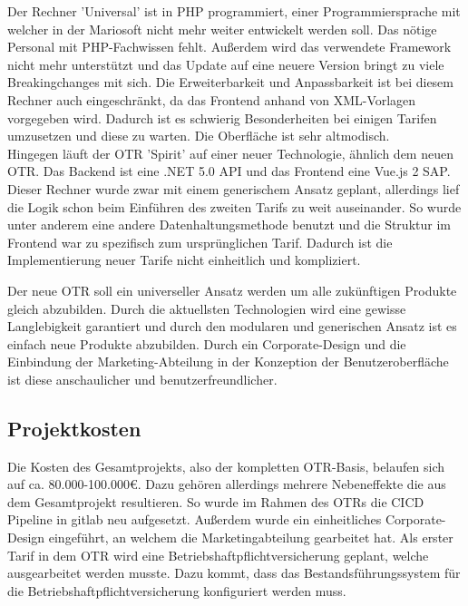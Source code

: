 Der Rechner 'Universal' ist in PHP programmiert, einer Programmiersprache mit welcher in der Mariosoft nicht mehr weiter entwickelt werden soll. Das nötige Personal mit PHP-Fachwissen fehlt. Außerdem wird das verwendete Framework nicht mehr unterstützt und das Update auf eine neuere Version bringt zu viele Breakingchanges mit sich. Die Erweiterbarkeit und Anpassbarkeit ist bei diesem Rechner auch eingeschränkt, da das Frontend anhand von XML-Vorlagen vorgegeben wird. Dadurch ist es schwierig Besonderheiten bei einigen Tarifen umzusetzen und diese zu warten. Die Oberfläche ist sehr altmodisch. \\
Hingegen läuft der \ac{OTR} 'Spirit' auf einer neuer Technologie, ähnlich dem neuen \ac{OTR}. Das Backend ist eine .NET 5.0 API und das Frontend eine Vue.js 2 \ac{SAP}. Dieser Rechner wurde zwar mit einem generischem Ansatz geplant, allerdings lief die Logik schon beim Einführen des zweiten Tarifs zu weit auseinander. So wurde unter anderem eine andere Datenhaltungsmethode benutzt und die Struktur im Frontend war zu spezifisch zum ursprünglichen Tarif. Dadurch ist die Implementierung neuer Tarife nicht einheitlich und kompliziert.

Der neue \ac{OTR} soll ein universeller Ansatz werden um alle zukünftigen Produkte gleich abzubilden. Durch die aktuellsten Technologien wird eine gewisse Langlebigkeit garantiert und durch den modularen und generischen Ansatz ist es einfach neue Produkte abzubilden. Durch ein Corporate-Design und die Einbindung der Marketing-Abteilung in der Konzeption der Benutzeroberfläche ist diese anschaulicher und benutzerfreundlicher.


\subsection{Projektkosten}
\label{projektkosten}
Die Kosten des Gesamtprojekts, also der kompletten \ac{OTR}-Basis, belaufen sich auf ca. 80.000-100.000€. Dazu gehören allerdings mehrere Nebeneffekte die aus dem Gesamtprojekt resultieren. So wurde im Rahmen des \ac{OTR}s die \ac{CICD} Pipeline in \gls{gitlab} neu aufgesetzt. Außerdem wurde ein einheitliches Corporate-Design eingeführt, an welchem die Marketingabteilung gearbeitet hat. Als erster Tarif in dem \ac{OTR} wird eine Betriebshaftpflichtversicherung geplant, welche ausgearbeitet werden musste. Dazu kommt, dass das Bestandsführungssystem für die Betriebshaftpflichtversicherung konfiguriert werden muss.\\


